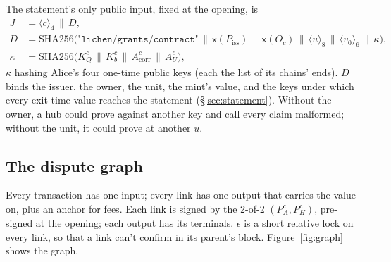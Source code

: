 \documentclass[11pt]{article}
\theoremstyle{plain}
\theoremstyle{definition}
\newcommand{\be}[2]{\langle #1\rangle_{#2}}
\newcommand{\xo}[1]{\mathsf{x}(#1)}
\newcommand{\Piss}{P_{\mathrm{iss}}}
\newcommand{\PH}{P_H^{c}}
\newcommand{\Oc}{O_c}
\newcommand{\KQ}{K_{Q}^{c}}
\newcommand{\Kb}{K_{b}^{c}}
\newcommand{\Acorr}{A_{\mathrm{corr}}^{c}}
\newcommand{\AU}{A_{U}^{c}}
\begin{document}
The statement's only public input, fixed at the opening, is
\begin{align*}
  J &= \be{c}{4} \,\|\, D,\\
  D &= \mathrm{SHA256}\big(\texttt{"lichen/grants/contract"} \,\|\,
  \xo{\Piss} \,\|\, \xo{\Oc} \,\|\, \be{u}{8} \,\|\, \be{v_0}{6} \,\|\,
  \kappa\big),\\
  \kappa &= \mathrm{SHA256}\big(\KQ \,\|\, \Kb \,\|\, \Acorr \,\|\, \AU\big),
\end{align*}
$\kappa$ hashing Alice's four one-time public keys (each the list of its
chains' ends). $D$ binds the issuer, the owner, the unit, the mint's
value, and the keys under which every exit-time value reaches the
statement (\S\ref{sec:statement}). Without the owner, a hub could prove
against another key and call every claim malformed; without the unit,
it could prove at another $u$.

\subsection{The dispute graph}\label{sec:graph}

Every transaction has one input; every link has one output that carries
the value on, plus an anchor for fees. Each link is signed by the 2-of-2
$(P_A^c, \PH)$, pre-signed at the opening; each output has its
terminals. $\epsilon$ is a short relative lock on every link, so that a
link can't confirm in its parent's block. Figure~\ref{fig:graph} shows
the graph.
\end{document}
